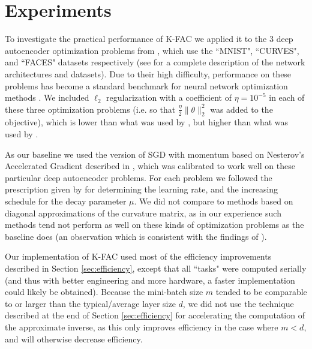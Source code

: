 \documentclass[12pt]{article}
\newcommand{\acronym}{K-FAC}
\begin{document}

\section{Experiments}
\label{sec:kfac_experiments}


To investigate the practical performance of \acronym{} we applied it to the 3 deep autoencoder optimization problems from \citet{HintonScience}, which use the ``MNIST", ``CURVES", and ``FACES" datasets respectively (see \citet{HintonScience} for a complete description of the network architectures and datasets).  Due to their high difficulty, performance on these problems has become a standard benchmark for neural network optimization methods \citep[e.g.][]{HF,KSD,momentum_ilya}.  We included $\ell_2$ regularization with a coefficient of $\eta = 10^{-5}$ in each of these three optimization problems (i.e. so that $\frac{\eta}{2} \|\theta\|_2^2$ was added to the objective), which is lower than what was used by \citet{HF}, but higher than what was used by \citet{momentum_ilya}.


As our baseline we used the version of SGD with momentum based on Nesterov's Accelerated Gradient \citep{NAG} described in \citet{momentum_ilya}, which was calibrated to work well on these particular deep autoencoder problems.  For each problem we followed the prescription given by \citet{momentum_ilya} for determining the learning rate, and the increasing schedule for the decay parameter $\mu$. %
We did not compare to methods based on diagonal approximations of the curvature matrix, as in our experience such methods tend not perform as well on these kinds of optimization problems as the baseline does (an observation which is consistent with the findings of \citet{schraudolph, ADADELTA}).

Our implementation of \acronym{} used most of the efficiency improvements described in Section \ref{sec:efficiency}, except that all ``tasks" were computed serially (and thus with better engineering and more hardware, a faster implementation could likely be obtained). Because the mini-batch size $m$ tended to be comparable to or larger than the typical/average layer size $d$, we did not use the technique described at the end of Section \ref{sec:efficiency} for accelerating the computation of the approximate inverse, as this only improves efficiency in the case where $m < d$, and will otherwise decrease efficiency.
\end{document}
